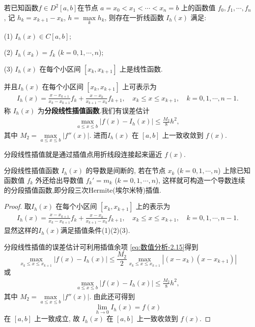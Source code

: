 \documentclass[../../main.tex]{subfiles}
\begin{document}
\begin{theorem}[分段线性插值]
若已知函数$f\in D^2[a,b]$在节点 $a = x_0 < x_1 < \cdots < x_n = b$ 上的函数值 $f_0, f_1, \cdots, f_n$, 记 $h_k = x_{k + 1} - x_k$, $h = \max\limits_k h_k$, 则存在一折线函数 $I_h(x)$ 满足:

(1) $I_h(x) \in C[a, b]$;

(2) $I_h(x_k) = f_k$ ($k = 0, 1, \cdots, n$);

(3) $I_h(x)$ 在每个小区间 $[x_k, x_{k + 1}]$ 上是线性函数.

并且$I_h(x)$ 在每个小区间 $[x_k, x_{k + 1}]$ 上可表示为
\begin{align}
I_h(x) = \frac{x - x_{k + 1}}{x_k - x_{k + 1}} f_k + \frac{x - x_k}{x_{k + 1} - x_k} f_{k + 1}, \quad x_k \leqslant x \leqslant x_{k + 1}, \quad k = 0, 1, \cdots, n - 1. \label{5.1}
\end{align}
称 $I_h(x)$ 为\textbf{分段线性插值函数}.我们有误差估计
\begin{align}
\max_{a \leqslant x \leqslant b} | f(x) - I_h(x) | \leqslant \frac{M_2}{8} h^2, \label{5.2}
\end{align}
其中 $M_2 = \max\limits_{a \leqslant x \leqslant b} | f''(x) |$. 
进而$I_h(x)$ 在 $[a, b]$ 上一致收敛到 $f(x)$.
\end{theorem}
\begin{note}
分段线性插值就是通过插值点用折线段连接起来逼近 $f(x)$. 
\end{note}
\begin{note}
分段线性插值函数 $I_h(x)$ 的导数是间断的, 若在节点 $x_k$ ($k = 0, 1, \cdots, n$) 上除已知函数值 $f_k$ 外还给出导数值 $f_k' = m_k$ ($k = 0, 1, \cdots, n$), 这样就可构造一个导数连续的分段插值函数,即分段三次Hermite(埃尔米特)插值.
\end{note}
\begin{proof}
取$I_h(x)$ 在每个小区间 $[x_k, x_{k + 1}]$ 上的表示为
\begin{align*}
I_h(x) = \frac{x - x_{k + 1}}{x_k - x_{k + 1}} f_k + \frac{x - x_k}{x_{k + 1} - x_k} f_{k + 1}, \quad x_k \leqslant x \leqslant x_{k + 1}, \quad k = 0, 1, \cdots, n - 1.
\end{align*}
显然这样的$I_h(x)$满足插值条件(1)(2)(3).

分段线性插值的误差估计可利用插值余项 \eqref{eq:数值分析-2.15}得到
\[
\max_{x_k \leqslant x \leqslant x_{k + 1}} | f(x) - I_h(x) | \leqslant \frac{M_2}{2} \max_{x_k \leqslant x \leqslant x_{k + 1}} | (x - x_k)(x - x_{k + 1}) |
\]
或
\begin{align*}
\max_{a \leqslant x \leqslant b} | f(x) - I_h(x) | \leqslant \frac{M_2}{8} h^2,
\end{align*}
其中 $M_2 = \max\limits_{a \leqslant x \leqslant b} | f''(x) |$. 由此还可得到
\[
\lim_{h \to 0} I_h(x) = f(x)
\]
在 $[a, b]$ 上一致成立, 故 $I_h(x)$ 在 $[a, b]$ 上一致收敛到 $f(x)$.

\end{proof}
\end{document}
